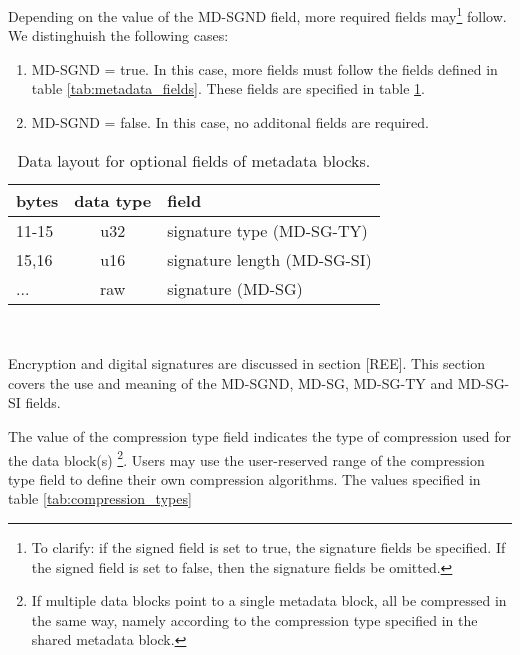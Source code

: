 \documentclass[pagesize=a4]{tufte-book}
\begin{document}
Depending on the value of the MD-SGND field, more required fields may\footnote{To clarify: if the signed field is set to true, the signature fields  be specified. If the signed field is set to false, then the signature fields  be omitted.} follow. We distinghuish the following cases:

\begin{enumerate}
	\item MD-SGND = true. In this case, more fields must follow the fields defined in table \ref{tab:metadata_fields}. These fields are specified in table \ref{tab:metadata_optional_fields}.
	\item MD-SGND = false. In this case, no additonal fields are required.
\end{enumerate}

\begin{table}[ht]
	\centering
	\selectfont
	\begin{tabular}{lcl}
		\toprule
		bytes & data type & field\\
		\midrule
		11-15 & u32 & signature type (MD-SG-TY)\\
		15,16 & u16 & signature length (MD-SG-SI)\\
		... & raw & signature (MD-SG)\\
		\bottomrule
	\end{tabular}
	~\label{tab:metadata_optional_fields}
	\caption{Data layout for optional fields of metadata blocks.}	
\end{table}
\vspace{5mm}

Encryption and digital signatures are discussed in section [REE]. This section covers the use and meaning of the MD-SGND, MD-SG, MD-SG-TY and MD-SG-SI fields.

The value of the compression type field indicates the type of compression used for the data block(s) \footnote{If multiple data blocks point to a single metadata block, all  be compressed in the same way, namely according to the compression type specified in the shared metadata block.}. Users may use the user-reserved range of the compression type field to define their own compression algorithms. The values specified in table \ref{tab:compression_types}
\end{document}
